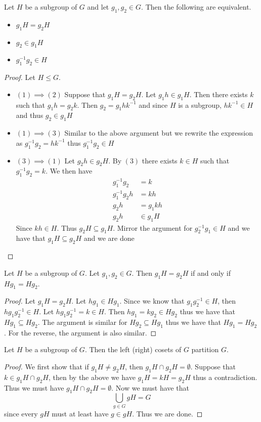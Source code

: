 \documentclass[a4paper]{article}
\begin{document}
\begin{prp}{}{} Let $H$ be a subgroup of $G$ and let $g_1,g_2\in G$. Then the following are equivalent. 
\begin{itemize}
\item $g_1H=g_2H$
\item $g_2\in g_1H$
\item $g_1^{-1}g_2\in H$
\end{itemize}
\begin{proof} Let $H\leq G$. 
\begin{itemize}
\item $(1)\implies(2)$ Suppose that $g_1H=g_2H$. Let $g_1h\in g_1H$. Then there exists $k$ such that $g_1h=g_2k$. Then $g_2=g_1hk^{-1}$ and since $H$ is a subgroup, $hk^{-1}\in H$ and thus $g_2\in g_1H$
\item $(1)\implies(3)$ Similar to the above argument but we rewrite the expression as $g_1^{-1}g_2=hk^{-1}$ thus $g_1^{-1}g_2\in H$
\item $(3)\implies(1)$ Let $g_2h\in g_2H$. By $(3)$ there exists $k\in H$ such that $g_1^{-1}g_2=k$. We then have 
\begin{align*}
g_1^{-1}g_2&=k\\
g_1^{-1}g_2h&=kh\\
g_2h&=g_1kh\\
g_2h&\in g_1H
\end{align*} Since $kh\in H$. Thus $g_2H\subseteq g_1H$. Mirror the argument for $g_2^{-1}g_1\in H$ and we have that $g_1H\subseteq g_2H$ and we are done
\end{itemize}
\end{proof}
\end{prp}

\begin{prp}{}{} Let $H$ be a subgroup of $G$. Let $g_1,g_2\in G$. Then $g_1H=g_2H$ if and only if $Hg_1=Hg_2$. 
\begin{proof} Let $g_1H=g_2H$. Let $hg_1\in Hg_1$. Since we know that $g_1g_2^{-1}\in H$, then $hg_1g_2^{-1}\in H$. Let $hg_1g_2^{-1}=k\in H$. Then $hg_1=kg_2\in Hg_2$ thus we have that $Hg_1\subseteq Hg_2$. The argument is similar for $Hg_2\subseteq Hg_1$ thus we have that $Hg_1=Hg_2$. For the reverse, the argument is also similar. 
\end{proof}
\end{prp}

\begin{prp}{}{} Let $H$ be a subgroup of $G$. Then the left (right) cosets of $G$ partition $G$. 
\begin{proof} We first show that if $g_1H\neq g_2H$, then $g_1H\cap g_2H=\emptyset$. Suppose that $k\in g_1H\cap g_2H$, then by the above we have $g_1H=kH=g_2H$ thus a contradiction. Thus we must have $g_1H\cap g_2H=\emptyset$. Now we must have that $$\bigcup_{g\in G}gH=G$$ since every $gH$ must at least have $g\in gH$. Thus   we are done. 
\end{proof}
\end{prp}
\end{document}
